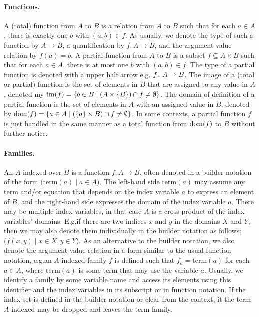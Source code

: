 \documentclass[../document.tex]{subfiles}
\begin{document}
    \paragraph{Functions.}
    A (total) function from \(A\) to \(B\) is a relation from \(A\) to \(B\) such that for each \(a \in A\), there is exactly one \(b\) with \((a,b) \in f\).
    As usually, we denote the type of such a function by \(A \to B\), a quantification by \(f\colon A \to B\), and the argument-value relation by \(f(a) = b\).
    A partial function from \(A\) to \(B\) is a subset \(f \subseteq A \times B\) such that for each \(a \in A\), there is at most one \(b\) with \((a,b) \in f\).
    The type of a partial function is denoted with a upper half arrow e.g. \(f\colon A \rightharpoonup B\).
    The image of a (total or partial) function is the set of elements in \(B\) that are assigned to any value in \(A\), denoted my \(\operatorname{im}(f) = \{b\in B \mid (A \times \{B\}) \cap f \neq \emptyset\}\).
    The domain of definition of a partial function is the set of elements in \(A\) with an assigned value in \(B\), denoted by \(\operatorname{dom}(f) = \{a\in A \mid (\{a\} \times B) \cap f \neq \emptyset\}\).
    In some contexts, a partial function \(f\) is just handled in the same manner as a total function from \(\operatorname{dom}(f)\) to \(B\) without further notice.

    \paragraph{Families.}
    An \(A\)-indexed  over \(B\) is a function \(f\colon A \to B\), often  denoted in a builder notation of the form \(\big(\mathrm{term}(a) \mid a \in A\big)\).
    The left-hand side \(\mathrm{term}(a)\) may assume any term and/or equation that depends on the index variable \(a\) to express an element of \(B\), and the right-hand side expresses the domain of the index variable \(a\).
    There may be multiple index variables, in that case \(A\) is a cross product of the index variables' domains.
    E.g.\@ if there are two indices \(x\) and \(y\) in the domains \(X\) and \(Y\), then we may also denote them individually in the builder notation as follows: \(\big( f(x,y) \mid x \in X, y \in Y \big)\).
    As an alternative to the builder notation, we also denote the argument-value relation in a form similar to the usual function notation, e.g.\@ an \(A\)-indexed family \(f\) is defined such that \(f_a = \mathrm{term}(a)\) for each \(a \in A\), where \(\mathrm{term}(a)\) is some term that may use the variable \(a\).
    Usually, we identify a family by some variable name and access its elements using this identifier and the index variables in its subscript or in function notation.
    If the index set is defined in the builder notation or clear from the context, it the term \(A\)-indexed may be dropped and leaves the term family.
\end{document}
